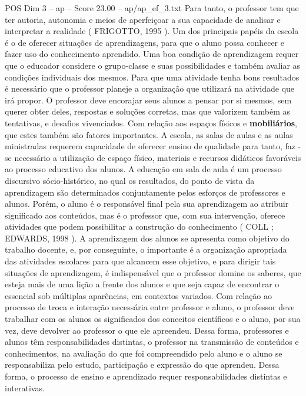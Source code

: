 \begin{textsample}{POS Dim 3 – ap – Score 23.00 – ap/ap\_ef\_3.txt}
Para tanto, o professor tem que ter autoria, autonomia e meios de aperfeiçoar a sua capacidade de analisar e interpretar a realidade ( FRIGOTTO, 1995 ).
Um dos principais papéis da escola é o de oferecer situações de aprendizagens, para que o aluno possa conhecer e fazer uso do conhecimento aprendido.
Uma boa condição de aprendizagem requer que o educador considere o grupo-classe e suas possibilidades e também avaliar as condições individuais dos mesmos.
Para que uma atividade tenha bons resultados é necessário que o professor planeje a organização que utilizará na atividade que irá propor.
O professor deve encorajar seus alunos a pensar por si mesmos, sem querer obter deles, respostas e soluções corretas, mas que valorizem também as tentativas, e desafios vivenciados.
Com relação aos espaços físicos e \textbf{mobiliários}, que estes também são fatores importantes.
A escola, as salas de aulas e as aulas ministradas requerem capacidade de oferecer ensino de qualidade para tanto, faz -se necessário a utilização de espaço físico, materiais e recursos didáticos favoráveis ao processo educativo dos alunos.
A educação em sala de aula é um processo discursivo sócio-histórico, no qual os resultados, do ponto de vista da aprendizagem são determinados conjuntamente pelos esforços de professores e alunos.
Porém, o aluno é o responsável final pela sua aprendizagem ao atribuir significado aos conteúdos, mas é o professor que, com sua intervenção, oferece atividades que podem possibilitar a construção do conhecimento ( COLL ; EDWARDS, 1998 ).
A aprendizagem dos alunos se apresenta como objetivo do trabalho docente, e, por conseguinte, o importante é a organização apropriada das atividades escolares para que alcancem esse objetivo, e para dirigir tais situações de aprendizagem, é indispensável que o professor domine os saberes, que esteja mais de uma lição a frente dos alunos e que seja capaz de encontrar o essencial sob múltiplas aparências, em contextos variados.
Com relação ao processo de troca e interação necessária entre professor e aluno, o professor deve trabalhar com os alunos os significados dos conceitos científicos e o aluno, por sua vez, deve devolver ao professor o que ele apreendeu.
Dessa forma, professores e alunos têm responsabilidades distintas, o professor na transmissão de conteúdos e conhecimentos, na avaliação do que foi compreendido pelo aluno e o aluno se responsabiliza pelo estudo, participação e expressão do que aprendeu.
Dessa forma, o processo de ensino e aprendizado requer responsabilidades distintas e interativas.

\end{textsample}
